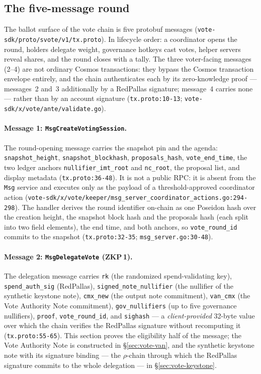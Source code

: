 \documentclass[11pt,a4paper]{article}
\theoremstyle{definition}
\begin{document}
\subsection{The five-message round}\label{sec:vote-messages}

The ballot surface of the vote chain is five protobuf messages
(\texttt{vote-sdk/proto/svote/v1/\allowbreak tx.proto}). In lifecycle order: a
coordinator opens the round, holders delegate weight, governance hotkeys
cast votes, helper servers reveal shares, and the round closes with a tally.
The three voter-facing messages (2--4) are not ordinary Cosmos transactions:
they bypass the Cosmos transaction envelope entirely, and the chain
authenticates each by its zero-knowledge proof --- messages~2 and~3
additionally by a RedPallas signature; message~4 carries none --- rather
than by an account signature (\texttt{tx.proto:10-13};
\texttt{vote-sdk/x/vote/ante/\allowbreak validate.go}).

\paragraph{Message 1: \texttt{MsgCreateVotingSession}.} The round-opening
message carries the snapshot pin and the agenda: \texttt{snapshot\_height},
\texttt{snapshot\_blockhash}, \texttt{proposals\_hash},
\texttt{vote\_end\_time}, the two ledger anchors
\texttt{nullifier\_imt\_root} and \texttt{nc\_root}, the proposal list, and
display metadata (\texttt{tx.proto:36-48}). It is not a public RPC: it is
absent from the \texttt{Msg} service and executes only as the payload of a
threshold-approved coordinator action
(\texttt{vote-sdk/x/vote/keeper/msg\_server\_coordinator\_actions.go:294-298}).
The handler derives the round identifier on-chain as one Poseidon hash
over the creation height, the snapshot block hash and the proposals hash
(each split into two field elements), the end time, and both anchors, so
\texttt{vote\_round\_id} commits to the snapshot
(\texttt{tx.proto:32-35}; \texttt{msg\_server.go:30-48}).

\paragraph{Message 2: \texttt{MsgDelegateVote} (ZKP\,1).} The delegation
message carries \texttt{rk} (the randomized spend-validating key),
\texttt{spend\_auth\_sig} (RedPallas), \texttt{signed\_note\_nullifier} (the
nullifier of the synthetic keystone note), \texttt{cmx\_new} (the output
note commitment), \texttt{van\_cmx} (the Vote Authority Note commitment),
\texttt{gov\_nullifiers} (up to five governance nullifiers),
\texttt{proof}, \texttt{vote\_round\_id}, and \texttt{sighash} --- a
\emph{client-provided} 32-byte value over which the chain verifies the
RedPallas signature without recomputing it (\texttt{tx.proto:55-65}). This
section proves the eligibility half of the message; the Vote Authority Note
is constructed in \S\ref{sec:vote-van}, and the synthetic keystone note
with its signature binding --- the $\rho$-chain through which the RedPallas
signature commits to the whole delegation --- in
\S\ref{sec:vote-keystone}.
\end{document}
